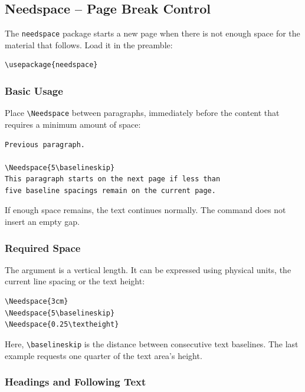 \subsection{Needspace -- Page Break Control}

The \texttt{needspace} package starts a new page when there is not
enough space for the material that follows. Load it in the preamble:

\begin{lstlisting}[style=latex]
\usepackage{needspace}
\end{lstlisting}

\subsubsection{Basic Usage}

Place \verb|\Needspace| between paragraphs, immediately before
the content that requires a minimum amount of space:

\begin{lstlisting}[style=latex]
Previous paragraph.

\Needspace{5\baselineskip}
This paragraph starts on the next page if less than
five baseline spacings remain on the current page.
\end{lstlisting}

If enough space remains, the text continues normally.
The command does not insert an empty gap.

\subsubsection{Required Space}

The argument is a vertical length. It can be expressed using
physical units, the current line spacing or the text height:

\begin{lstlisting}[style=latex]
% Alternative ways to specify the required space:
\Needspace{3cm}
\Needspace{5\baselineskip}
\Needspace{0.25\textheight}
\end{lstlisting}

Here, \verb|\baselineskip| is the distance between consecutive
text baselines. The last example requests one quarter of the
text area's height.

\subsubsection{Headings and Following Text}

